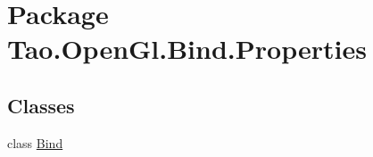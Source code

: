 \hypertarget{namespace_tao_1_1_open_gl_1_1_bind_1_1_properties}{
\section{Package Tao.OpenGl.Bind.Properties}
\label{namespace_tao_1_1_open_gl_1_1_bind_1_1_properties}
}
\subsection*{Classes}
\begin{DoxyCompactItemize}
\item 
class \hyperlink{class_tao_1_1_open_gl_1_1_bind_1_1_properties_1_1_bind}{Bind}
\end{DoxyCompactItemize}
